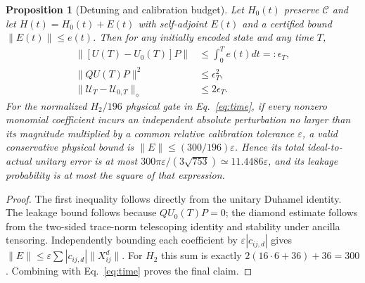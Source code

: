 \documentclass[aps,pra,twocolumn,nofootinbib,superscriptaddress,10pt]{revtex4-2}
\newtheorem{proposition}{Proposition}
\newcommand{\Cc}{\mathcal C}\newcommand{\HH}{\mathcal H}\newcommand{\Id}{\mathbb I}
\begin{document}
\begin{proposition}[Detuning and calibration budget]\label{prop:noise}
Let $H_0(t)$ preserve $\Cc$ and let $H(t)=H_0(t)+E(t)$ with self-adjoint $E(t)$ and a certified bound $\|E(t)\|\le e(t)$. Then for any initially encoded state and any time $T$,
\begin{align}
 \|[U(T)-U_0(T)]P\|&\le\int_0^T e(t)dt=:\epsilon_T,\\
 \|QU(T)P\|^2&\le\epsilon_T^2,\label{eq:leakage_bound}\\
 \|\mathcal U_T-\mathcal U_{0,T}\|_\diamond&\le2\epsilon_T.
\end{align}
For the normalized $H_2/196$ physical gate in Eq.~\eqref{eq:time}, if every nonzero monomial coefficient incurs an independent absolute perturbation no larger than its magnitude multiplied by a common relative calibration tolerance $\varepsilon$, a valid conservative physical bound is $\|E\|\le(300/196)\varepsilon$. Hence its total ideal-to-actual unitary error is at most $300\pi\varepsilon/(3\sqrt{753})\simeq11.4486\varepsilon$, and its leakage probability is at most the square of that expression.
\end{proposition}
\begin{proof}
The first inequality follows directly from the unitary Duhamel identity. The leakage bound follows because $QU_0(T)P=0$; the diamond estimate follows from the two-sided trace-norm telescoping identity and stability under ancilla tensoring. Independently bounding each coefficient by $\varepsilon|c_{ij,d}|$ gives $\|E\|\le\varepsilon\sum|c_{ij,d}|\|X_{ij}^d\|$. For $H_2$ this sum is exactly $2(16\cdot6+36)+36=300$. Combining with Eq.~\eqref{eq:time} proves the final claim.\end{proof}
\end{document}
